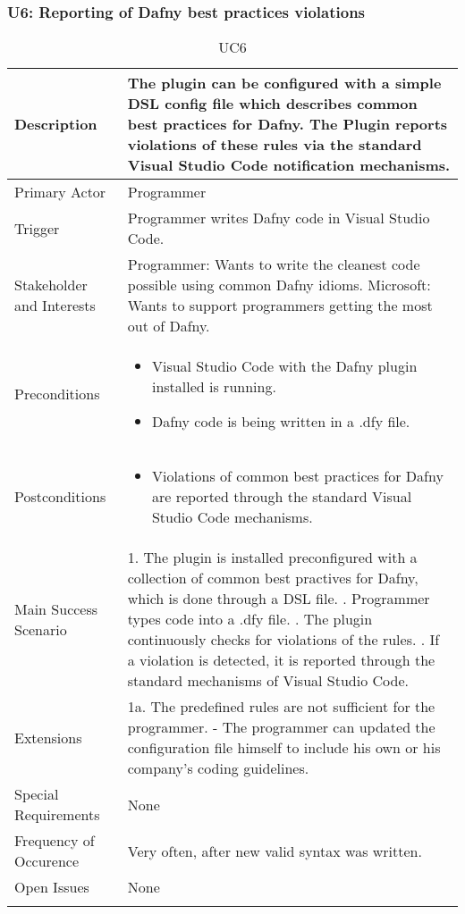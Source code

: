 \subsubsection{U6: Reporting of Dafny best practices violations}
\begin{longtable}{l | p{} }
	Description & The plugin can be configured with a simple DSL config file which describes common best practices for Dafny. The Plugin reports violations of these rules via the standard Visual Studio Code notification mechanisms.\\ \hline
	Primary Actor & Programmer\\ \hline
	Trigger & Programmer writes Dafny code in Visual Studio Code.\\ \hline
	Stakeholder and Interests & Programmer: Wants to write the cleanest code possible using common Dafny idioms. \newline Microsoft: Wants to support programmers getting the most out of Dafny.\\ \hline
	Preconditions &
	\begin{itemize}
		\item Visual Studio Code with the Dafny plugin installed is running.
		\item Dafny code is being written in a .dfy file.
	\end{itemize}\\ \hline
	Postconditions &
	\begin{itemize}
		\item Violations of common best practices for Dafny are reported through the standard Visual Studio Code mechanisms.
	\end{itemize}\\ \hline
	Main Success Scenario & 
	1. The plugin is installed preconfigured with a collection of common best practives for Dafny, which is done through a DSL file. \newline
	2. Programmer types code into a .dfy file. \newline 
	3. The plugin continuously checks for violations of the rules. \newline 
	4. If a violation is detected, it is reported through the standard mechanisms of Visual Studio Code.\\ \hline
	Extensions & 
	1a. The predefined rules are not sufficient for the programmer. \newline 
	- The programmer can updated the configuration file himself to include his own or his company's coding guidelines. \\ \hline
	Special Requirements & None\\ \hline
	Frequency of Occurence & Very often, after new valid syntax was written.\\ \hline
	Open Issues & None \\ \hline
	\caption{UC6}
\end{longtable}